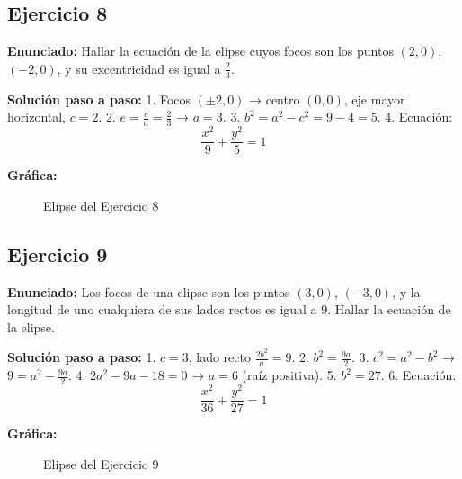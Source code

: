 \documentclass[12pt,a4paper]{article}
\begin{document}
\subsection{Ejercicio 8}
\textbf{Enunciado:} Hallar la ecuación de la elipse cuyos focos son los puntos \((2,0)\), \((-2,0)\), y su excentricidad es igual a \(\frac{2}{3}\).

\textbf{Solución paso a paso:}
1. Focos \((\pm 2,0)\) → centro \((0,0)\), eje mayor horizontal, \(c=2\).
2. \(e = \frac{c}{a} = \frac{2}{3}\) → \(a = 3\).
3. \(b^2 = a^2 - c^2 = 9 - 4 = 5\).
4. Ecuación:
   \[
   \frac{x^2}{9} + \frac{y^2}{5} = 1
   \]

\textbf{Gráfica:}
\begin{figure}[H]
\centering
{}
\caption{Elipse del Ejercicio 8}
\end{figure}
\newpage

\subsection{Ejercicio 9}
\textbf{Enunciado:} Los focos de una elipse son los puntos \((3,0)\), \((-3,0)\), y la longitud de uno cualquiera de sus lados rectos es igual a 9. Hallar la ecuación de la elipse.

\textbf{Solución paso a paso:}
1. \(c=3\), lado recto \(\frac{2b^2}{a} = 9\).
2. \(b^2 = \frac{9a}{2}\).
3. \(c^2 = a^2 - b^2\) → \(9 = a^2 - \frac{9a}{2}\).
4. \(2a^2 - 9a - 18 = 0\) → \(a = 6\) (raíz positiva).
5. \(b^2 = 27\).
6. Ecuación:
   \[
   \frac{x^2}{36} + \frac{y^2}{27} = 1
   \]

\textbf{Gráfica:}
\begin{figure}[H]
\centering
{}
\caption{Elipse del Ejercicio 9}
\end{figure}
\newpage
\end{document}
